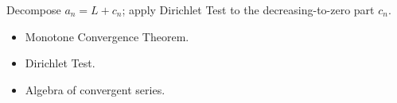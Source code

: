 \begin{remark*}
Decompose $a_n = L + c_n$; apply Dirichlet Test to the decreasing-to-zero part $c_n$.
\end{remark*}

\begin{remark*}[Dependencies]
\begin{itemize}
  \item Monotone Convergence Theorem.
  \item Dirichlet Test.
  \item Algebra of convergent series.
\end{itemize}
\end{remark*}

